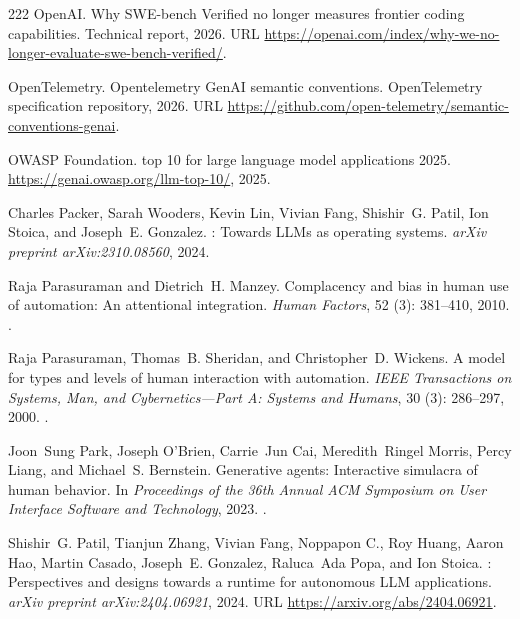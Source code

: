 \begin{thebibliography}{222}
{OpenAI}.
\newblock Why {SWE-bench Verified} no longer measures frontier coding
  capabilities.
\newblock Technical report, 2026.
\newblock URL
  \url{https://openai.com/index/why-we-no-longer-evaluate-swe-bench-verified/}.

{OpenTelemetry}.
\newblock Opentelemetry {GenAI} semantic conventions.
\newblock OpenTelemetry specification repository, 2026.
\newblock URL
  \url{https://github.com/open-telemetry/semantic-conventions-genai}.

{OWASP Foundation}.
 top 10 for large language model applications 2025.
\newblock \url{https://genai.owasp.org/llm-top-10/}, 2025.

Charles Packer, Sarah Wooders, Kevin Lin, Vivian Fang, Shishir~G. Patil, Ion
  Stoica, and Joseph~E. Gonzalez.
: Towards {LLM}s as operating systems.
\newblock \emph{arXiv preprint arXiv:2310.08560}, 2024.

Raja Parasuraman and Dietrich~H. Manzey.
\newblock Complacency and bias in human use of automation: An attentional
  integration.
\newblock \emph{Human Factors}, 52 (3): 381--410, 2010.
\newblock {}.

Raja Parasuraman, Thomas~B. Sheridan, and Christopher~D. Wickens.
\newblock A model for types and levels of human interaction with automation.
\newblock \emph{IEEE Transactions on Systems, Man, and Cybernetics---Part A:
  Systems and Humans}, 30 (3): 286--297, 2000.
\newblock {}.

Joon~Sung Park, Joseph O'Brien, Carrie~Jun Cai, Meredith~Ringel Morris, Percy
  Liang, and Michael~S. Bernstein.
\newblock Generative agents: Interactive simulacra of human behavior.
\newblock In \emph{Proceedings of the 36th Annual ACM Symposium on User
  Interface Software and Technology}, 2023.
\newblock {}.

Shishir~G. Patil, Tianjun Zhang, Vivian Fang, Noppapon C., Roy Huang, Aaron
  Hao, Martin Casado, Joseph~E. Gonzalez, Raluca~Ada Popa, and Ion Stoica.
: Perspectives and designs towards a runtime for autonomous
  {LLM} applications.
\newblock \emph{arXiv preprint arXiv:2404.06921}, 2024.
\newblock URL \url{https://arxiv.org/abs/2404.06921}.


\end{thebibliography}
